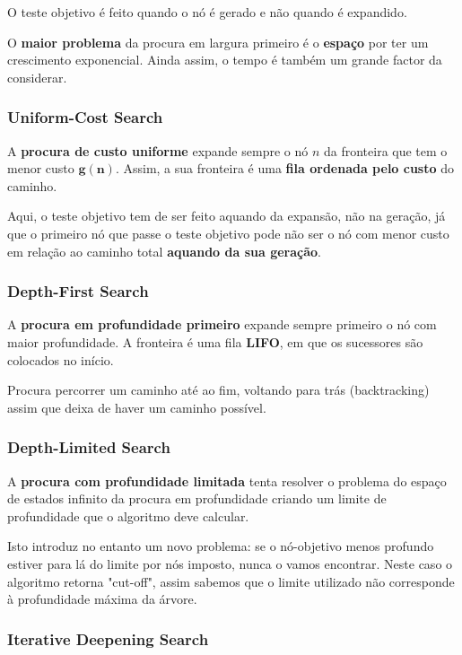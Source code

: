 \documentclass[11pt]{article}
\begin{document}
O teste objetivo é feito quando o nó é gerado e não quando é expandido.

O \textbf{maior problema} da procura em largura primeiro é o \textbf{espaço} por ter um crescimento exponencial. Ainda assim, o tempo é também um grande factor da considerar.

\subsubsection{Uniform-Cost Search}

A \textbf{procura de custo uniforme} expande sempre o nó $n$ da fronteira que tem o menor custo $\boldsymbol{g(n)}$. Assim, a sua fronteira é uma \textbf{fila ordenada pelo custo} do caminho.

Aqui, o teste objetivo tem de ser feito aquando da expansão, não na geração, já que o primeiro nó que passe o teste objetivo pode não ser o nó com menor custo em relação ao caminho total \textbf{aquando da sua geração}.

\subsubsection{Depth-First Search}

A \textbf{procura em profundidade primeiro} expande sempre primeiro o nó com maior profundidade. A fronteira é uma fila \textbf{LIFO}, em que os sucessores são colocados no início.

Procura percorrer um caminho até ao fim, voltando para trás (backtracking) assim que deixa de haver um caminho possível.

\subsubsection{Depth-Limited Search}

A \textbf{procura com profundidade limitada} tenta resolver o problema do espaço de estados infinito da procura em profundidade criando um limite de profundidade que o algoritmo deve calcular. 

Isto introduz no entanto um novo problema: se o nó-objetivo menos profundo estiver para lá do limite por nós imposto, nunca o vamos encontrar. Neste caso o algoritmo retorna "cut-off", assim sabemos que o limite utilizado não corresponde à profundidade máxima da árvore.

\subsubsection{Iterative Deepening Search}
\end{document}
